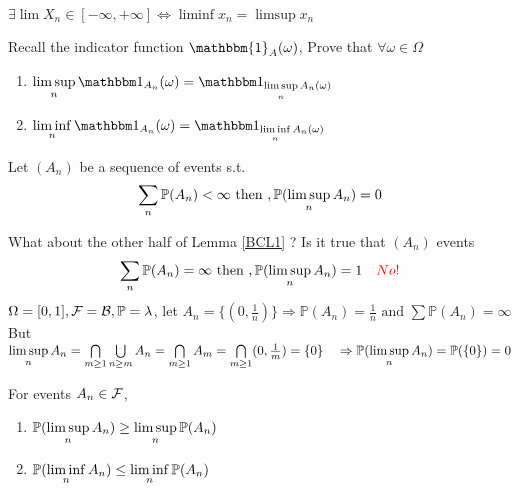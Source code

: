 \begin{thm}
$\exists \lim X_n \in [-\infty, +\infty] \Longleftrightarrow \liminf x_n = \limsup x_n$
\end{thm}
\begin{ex}
Recall the indicator function $\mathbbm{1}_A (\omega)$, Prove that $\forall \omega \in \Omega$
\begin{enumerate}
    \item $\limsup\limits_{n} \I_{A_n}(\omega) = \I_{\limsup\limits_{n}A_n(\omega)}$
    \item $\liminf\limits_{n} \I_{A_n}(\omega) = \I_{\liminf\limits_{n}A_n(\omega)}$
\end{enumerate}
\end{ex}
\vspace{1cm}
\begin{lem}\label{BCL1}
Let $(A_n)$ be a sequence of events s.t.
\begin{equation*}
    \sum\limits_{n} \mathbb{P}(A_n) < \infty \text{ then }, \mathbb{P}(\limsup\limits_{n} A_n) = 0
\end{equation*}
\end{lem}
\pf
\newpage
\begin{example}
What about the other half of Lemma \ref{BCL1} ? Is it true that $(A_n)$ events
\begin{equation*}
    \sum\limits_{n} \mathbb{P}(A_n) = \infty \text{ then }, \mathbb{P}(\limsup\limits_{n} A_n) = 1 \quad \textcolor{red}{No!}
\end{equation*}
$\Omega = [0,1], \mathcal{F} = \mathcal{B}, \mathbb{P} = \lambda$, let $A_n = \{(0, \frac{1}{n} )\} \Rightarrow \mathbb{P}(A_n) = \frac{1}{n} \text{ and } \sum\mathbb{P}(A_n) = \infty$ \\
But $\limsup\limits_{n} A_n = \bigcap\limits_{m\geq 1}\bigcup\limits_{n\geq m}A_n = \bigcap\limits_{m\geq 1} A_m = \bigcap\limits_{m\geq 1} (0, \frac{1}{m}) = \{0\} \quad \Rightarrow \mathbb{P}(\limsup\limits_{n} A_n) =  \mathbb{P}(\{0\}) = 0$\\
\end{example}
\begin{lem}
For events $A_n \in \mathcal{F}$,
\begin{enumerate}
    \item $\mathbb{P}(\limsup\limits_{n} A_n) \geq \limsup\limits_{n} \mathbb{P}(A_n)$
    \item $\mathbb{P}(\liminf\limits_{n} A_n) \leq \liminf\limits_{n} \mathbb{P}(A_n)$
\end{enumerate}
\end{lem}
\pf 
